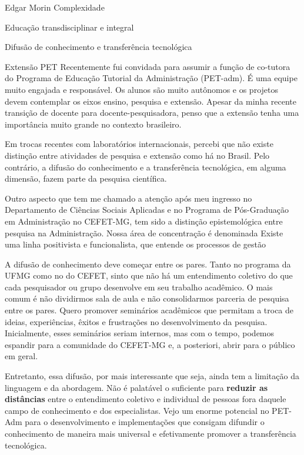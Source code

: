 \documentclass[
]{book}
\begin{document}
Edgar Morin
Complexidade

Educação transdisciplinar e integral

Difusão de conhecimento e transferência tecnológica

Extensão PET
Recentemente fui convidada para assumir a função de co-tutora do Programa de Educação Tutorial da Administração (PET-adm). É uma equipe muito engajada e responsável. Os alunos são muito autônomos e os projetos devem contemplar os eixos ensino, pesquisa e extensão. Apesar da minha recente transição de docente para docente-pesquisadora, penso que a extensão tenha uma importância muito grande no contexto brasileiro.

Em trocas recentes com laboratórios internacionais, percebi que não existe distinção entre atividades de pesquisa e extensão como há no Brasil. Pelo contrário, a difusão do conhecimento e a transferência tecnológica, em alguma dimensão, fazem parte da pesquisa científica.

Outro aspecto que tem me chamado a atenção após meu ingresso no Departamento de Ciências Sociais Aplicadas e no Programa de Pós-Graduação em Administração no CEFET-MG, tem sido a distinção epistemológica entre pesquisa na Administração. Nossa área de concentração é denominada Existe uma linha positivista e funcionalista, que entende os processos de gestão

A difusão de conhecimento deve começar entre os pares. Tanto no programa da UFMG como no do CEFET, sinto que não há um entendimento coletivo do que cada pesquisador ou grupo desenvolve em seu trabalho acadêmico. O mais comum é não dividirmos sala de aula e não consolidarmos parceria de pesquisa entre os pares. Quero promover seminários acadêmicos que permitam a troca de ideias, experiências, êxitos e frustrações no desenvolvimento da pesquisa. Inicialmente, esses seminários seriam internos, mas com o tempo, podemos espandir para a comunidade do CEFET-MG e, a posteriori, abrir para o público em geral.

Entretanto, essa difusão, por mais interessante que seja, ainda tem a limitação da linguagem e da abordagem. Não é palatável o suficiente para \textbf{reduzir as distâncias} entre o entendimento coletivo e individual de pessoas fora daquele campo de conhecimento e dos especialistas. Vejo um enorme potencial no PET-Adm para o desenvolvimento e implementações que consigam difundir o conhecimento de maneira mais universal e efetivamente promover a transferência tecnológica.

  
\end{document}
